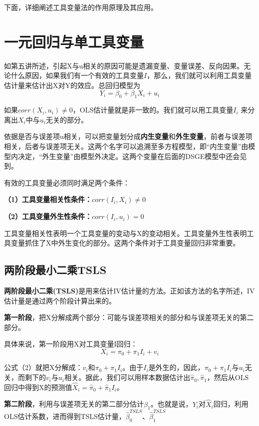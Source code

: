 \documentclass[cn,10pt,math=newtx,citestyle=gb7714-2015,bibstyle=gb7714-2015]{elegantbook}
\begin{document}
	下面，详细阐述工具变量法的作用原理及其应用。
	
	\section{一元回归与单工具变量}
	如第五讲所述，引起X与u相关的原因可能是遗漏变量、变量误差、反向因果。无论什么原因，如果我们有一个有效的工具变量$I$，那么，我们就可以利用工具变量估计量来估计出X对Y的效应。总回归模型为
	\begin{equation}
		Y_i=\beta_0+\beta_1X_i+u_i
	\end{equation}
	
	如果$corr(X_i,u_i)\neq0$，OLS估计量就是非一致的。我们就可以用工具变量$I_i$ 来分离出$X_i$中与$u_i$无关的部分。
	
	依据是否与误差项u相关，可以把变量划分成\textbf{内生变量}和\textbf{外生变量}，前者与误差项相关，后者与误差项无关。这两个名字可以追溯至多方程模型，即“内生变量”由模型内决定，“外生变量”由模型外决定。这两个变量在后面的DSGE模型中还会见到。
	
	有效的工具变量必须同时满足两个条件：
	
	\textbf{（1）工具变量相关性条件：$corr(I_i,X_i)\neq0$}
	
	\textbf{（2）工具变量外生性条件：$corr(I_i,u_i)=0$}
	
	工具变量相关性表明一个工具变量的变动与X的变动相关。工具变量外生性表明工具变量抓住了X中外生变化的部分。这两个条件对于工具变量回归非常重要。
	
	\subsection{两阶段最小二乘TSLS}
	\textbf{两阶段最小二乘(TSLS)}是用来估计IV估计量的方法。正如该方法的名字所述，IV估计量是通过两个阶段计算出来的。
	
	\textbf{第一阶段}，把X分解成两个部分：可能与误差项相关的部分和与误差项无关的第二部分。
	
	具体来说，第一阶段用X对工具变量I回归：
	\begin{equation}
		X_i=\pi_0+\pi_1I_i+v_i
	\end{equation}
	
	公式（2）就把X分解成：$v_i$和$\pi_0+\pi_1I_i$。由于$I_i$是外生的，因此，$\pi_0+\pi_1I_i$与$u_i$无关，而剩下的$v_i$与$u_i$相关。据此，我们可以用样本数据估计出$\hat{\pi}_0,\hat{\pi}_1$，然后从OLS回归中得到X的预测值$\hat{X}_i=\hat{\pi}_0+\hat{\pi}_1I_i$。
	
	\textbf{第二阶段}，利用与误差项无关的第二部分估计$\beta_1$。也就是说，$Y_i$对$\hat{X}_i$回归，利用OLS估计系数，进而得到TSLS估计量，$\hat{\beta}_0^{TSLS}、\hat{\beta}_1^{TSLS}$
	
\end{document}
